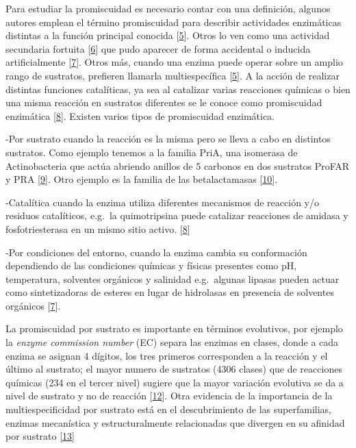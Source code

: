 \documentclass[12pt,twoside]{reedthesis}
\begin{document}
  Para estudiar la promiscuidad es necesario contar con una definición,
  algunos autores emplean el término promiscuidad para describir
  actividades enzimáticas distintas a la función principal conocida
  {[}\protect\hyperlink{ref-khersonsky_enzyme_2010}{5}{]}. Otros lo ven
  como una actividad secundaria fortuita
  {[}\protect\hyperlink{ref-copley_enzymes_2003}{6}{]} que pudo aparecer
  de forma accidental o inducida artificialmente
  {[}\protect\hyperlink{ref-hult_enzyme_2007}{7}{]}. Otros más, cuando una
  enzima puede operar sobre un amplio rango de sustratos, prefieren
  llamarla multiespecífica
  {[}\protect\hyperlink{ref-khersonsky_enzyme_2010}{5}{]}. A la acción de
  realizar distintas funciones catalíticas, ya sea al catalizar varias
  reacciones químicas o bien una misma reacción en sustratos diferentes se
  le conoce como promiscuidad enzimática
  {[}\protect\hyperlink{ref-obrien_catalytic_1999}{8}{]}. Existen varios
  tipos de promiscuidad enzimática.
  
  -Por sustrato cuando la reacción es la misma pero se lleva a cabo en
  distintos sustratos. Como ejemplo tenemos a la familia PriA, una
  isomerasa de Actinobacteria que actúa abriendo anillos de 5 carbonos en
  dos sustratos ProFAR y PRA
  {[}\protect\hyperlink{ref-baronagomez_occurrence_2003}{9}{]}. Otro
  ejemplo es la familia de las betalactamasas
  {[}\protect\hyperlink{ref-risso_phenotypic_2014}{10}{]}.
  
  -Catalítica cuando la enzima utiliza diferentes mecanismos de reacción
  y/o residuos catalíticos, e.g.~la quimotripsina puede catalizar
  reacciones de amidasa y fosfotriesterasa en un mismo sitio activo.
  {[}\protect\hyperlink{ref-obrien_catalytic_1999}{8}{]}
  
  -Por condiciones del entorno, cuando la enzima cambia su conformación
  dependiendo de las condiciones químicas y físicas presentes como pH,
  temperatura, solventes orgánicos y salinidad e.g.~algunas lipasas pueden
  actuar como sintetizadoras de esteres en lugar de hidrolasas en
  presencia de solventes orgánicos
  {[}\protect\hyperlink{ref-hult_enzyme_2007}{7}{]}.
  
  La promiscuidad por sustrato es importante en términos evolutivos, por
  ejemplo la \emph{enzyme commission number} (EC) separa las enzimas en
  clases, donde a cada enzima se asignan 4 dígitos, los tres primeros
  corresponden a la reacción y el último al sustrato; el mayor numero de
  sustratos (4306 clases) que de reacciones químicas (234 en el tercer
  nivel) sugiere que la mayor variación evolutiva se da a nivel de
  sustrato y no de reacción
  {[}\protect\hyperlink{ref-li_computational_2004}{12}{]}. Otra evidencia
  de la importancia de la multiespecificidad por sustrato está en el
  descubrimiento de las superfamilias, enzimas mecanística y
  estructuralmente relacionadas que divergen en su afinidad por sustrato
  {[}\protect\hyperlink{ref-glasner_evolution_2006}{13}{]}
  
\end{document}
